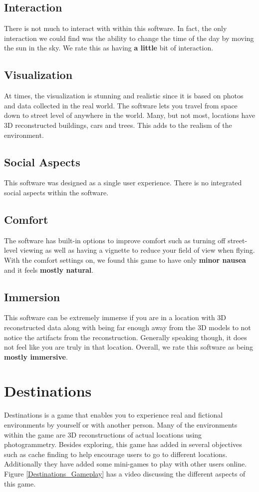 \documentclass[journal]{IEEEtran}
\begin{document}
\subsection{Interaction}
There is not much to interact with within this software. In fact, the only interaction we could find was the ability to change the time of the day by moving the sun in the sky. We rate this as having \textbf{a little} bit of interaction. 
\subsection{Visualization}
At times, the visualization is stunning and realistic since it is based on photos and data collected in the real world. The software lets you travel from space down to street level of anywhere in the world. Many, but not most, locations have 3D reconstructed buildings, cars and trees. This adds to the realism of the environment. 
\subsection{Social Aspects}
This software was designed as a single user experience. There is no integrated social aspects within the software. 
\subsection{Comfort}
The software has built-in options to improve comfort such as turning off street-level viewing as well as having a vignette to reduce your field of view when flying. With the comfort settings on, we found this game to have only \textbf{minor nausea} and it feels \textbf{mostly natural}. 
\subsection{Immersion}
This software can be extremely immerse if you are in a location with 3D reconstructed data along with being far enough away from the 3D models to not notice the artifacts from the reconstruction. Generally speaking though, it does not feel like you are truly in that location. Overall, we rate this software as being \textbf{mostly immersive}.


\section{Destinations}
Destinations is a game that enables you to experience real and fictional environments by yourself or with another person. Many of the environments within the game are 3D reconstructions of actual locations using photogrammetry. Besides exploring, this game has added in several objectives such as cache finding to help encourage users to go to different locations. Additionally they have added some mini-games to play with other users online. Figure \ref{Destinations_Gameplay} has a video discussing the different aspects of this game. 
 
\end{document}
